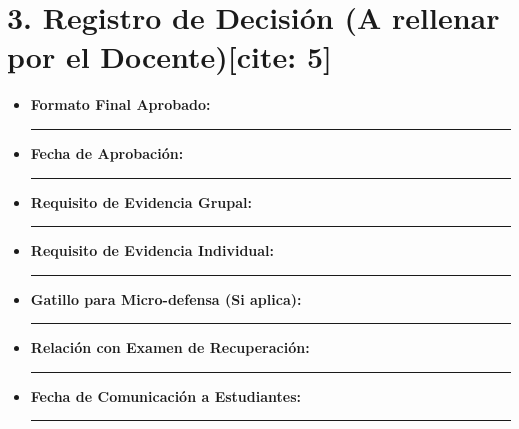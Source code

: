 \documentclass[11pt, a4paper]{article}
\begin{document}
\section*{3. Registro de Decisión (A rellenar por el Docente)[cite: 5]}
\begin{itemize}
    \item \textbf{Formato Final Aprobado:} \rule{8cm}{0.15mm}
    \item \textbf{Fecha de Aprobación:} \rule{8cm}{0.15mm}
    \item \textbf{Requisito de Evidencia Grupal:} \rule{7.3cm}{0.15mm}
    \item \textbf{Requisito de Evidencia Individual:} \rule{6.8cm}{0.15mm}
    \item \textbf{Gatillo para Micro-defensa (Si aplica):} \rule{6.3cm}{0.15mm}
    \item \textbf{Relación con Examen de Recuperación:} \rule{6.2cm}{0.15mm}
    \item \textbf{Fecha de Comunicación a Estudiantes:} \rule{6.2cm}{0.15mm}
\end{itemize}
\end{document}

